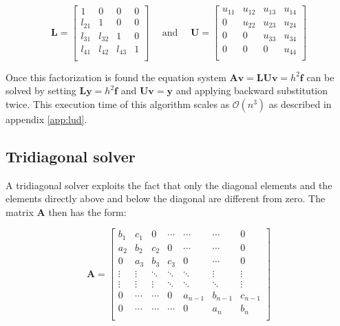 \documentclass{article}
\begin{document}
\begin{equation*}
\bm{L}=
\begin{bmatrix}
1      & 0      & 0       & 0       \\
l_{21} & 1      & 0       & 0       \\
l_{31} & l_{32} & 1       & 0       \\
l_{41} & l_{42} & l_{43}  & 1       \\
\end{bmatrix}
\quad \text{ and } \quad
\bm{U}=
\begin{bmatrix}
u_{11} & u_{12} & u_{13} & u_{14}   \\
0      & u_{22} & u_{23} & u_{24}   \\
0      & 0      & u_{33} & u_{34}   \\
0      & 0      & 0      & u_{44}   \\
\end{bmatrix}
\end{equation*}

Once this factorization is found the equation system $\bm{A}\bm{v}=\bm{L}\bm{U}\bm{v}=h^2\bm{f}$ can be solved by setting $\bm{L}\bm{y}=h^2\bm{f}$ and $\bm{U}\bm{v}=\bm{y}$ and applying backward substitution twice. This execution time of this algorithm scales as $\mathcal{O}(n^3)$ as described in appendix \ref{app:lud}.   


\subsection{Tridiagonal solver}
A tridiagonal solver exploits the fact that only the diagonal elements and the elements directly above and below the diagonal are different from zero. The matrix $\bm{A}$ then has the form:

\begin{equation*}
\bm{A} = 
\begin{bmatrix}
b_1    & c_1    & 0       & \cdots  & \cdots  & \cdots  & 0      \\
a_2    & b_2    & c_2     & 0       & \cdots  & \cdots  & 0      \\
0      & a_3    & b_3     & c_3     & 0       & \cdots  & 0      \\
\vdots & \vdots & \ddots  & \ddots  & \ddots  & \vdots  & \vdots \\
\vdots & \vdots & \vdots  & \ddots  & \ddots  & \ddots  & \vdots \\
0      & \cdots & \cdots  & 0       &a_{n-1} & b_{n-1} & c_{n-1} \\
0      & \cdots & \cdots  & \cdots  & 0       & a_n     & b_n    \\
\end{bmatrix}
\end{equation*}
\end{document}
